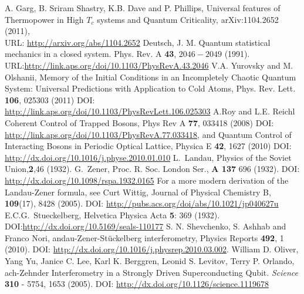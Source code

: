 \documentclass[a4paper,10pt]{article}
\begin{document}
\begin{thebibliography}{10}
\newblock A. Garg, B. Sriram Shastry, K.B. Dave and P. Phillips,
\newblock Universal features of Thermopower in High $T_c$ systems and Quantum Criticality,
\newblock arXiv:1104.2652 (2011),\\
\newblock URL: \url{http://arxiv.org/abs/1104.2652}
\newblock Deutsch, J. M. 
\newblock Quantum statistical mechanics in a closed system. 
\newblock Phys. Rev. A {\bf 43}, $2046-2049$ (1991).
\newblock URL:\url{http://link.aps.org/doi/10.1103/PhysRevA.43.2046}
\newblock V.A. Yurovsky and M. Olshanii,
\newblock Memory of the Initial Conditions in an Incompletely Chaotic Quantum System: Universal Predictions with Application to Cold Atoms,
\newblock  Phys. Rev. Lett. {\bf 106}, 025303 (2011) 
\newblock DOI: \url{http://link.aps.org/doi/10.1103/PhysRevLett.106.025303}
\newblock A.Roy and L.E. Reichl
\newblock Coherent Control of Trapped Bosons, 
\newblock Phys Rev A {\bf 77}, 033418 (2008)
\newblock DOI: \url{http://link.aps.org/doi/10.1103/PhysRevA.77.033418}, and
\newblock Quantum Control of Interacting Bosons in Periodic Optical Lattice, 
\newblock Physica E {\bf 42}, 1627 (2010)
\newblock DOI: \url{http://dx.doi.org/10.1016/j.physe.2010.01.010} 
\newblock L.~Landau, Physics of the Soviet Union,{\bf 2},46 (1932).
\newblock G.~Zener, Proc. R. Soc. London Ser., {\bf A 137} 696 (1932).
\newblock DOI: \url{http://dx.doi.org/10.1098/rspa.1932.0165} 
\newblock For a more modern derivation of the Landau-Zener formula, see
\newblock Curt Wittig, Journal of Physical Chemistry B, {\bf 109}(17), 8428 (2005).
\newblock DOI: \url{http://pubs.acs.org/doi/abs/10.1021/jp040627u}
\newblock E.C.G.~Stueckelberg,
\newblock Helvetica Physica Acta {\bf 5}: 369 (1932).
\newblock DOI:\url{http://dx.doi.org/10.5169/seals-110177}
\newblock S. N. Shevchenko, S. Ashhab and Franco Nori,
andau-{Z}ener-{S}t\"uckelberg interferometry,
\newblock Physics Reports {\bf 492}, 1 (2010).
\newblock DOI: \url{http://dx.doi.org/10.1016/j.physrep.2010.03.002}.
\newblock William D. Oliver, Yang Yu, Janice C. Lee, Karl K. Berggren, Leonid S. Levitov, Terry P. Orlando,
ach-{Z}ehnder {I}nterferometry in a {S}trongly {D}riven {S}uperconducting {Q}ubit.
\newblock \textit{Science} {\bf 310} - 5754, 1653 (2005).
\newblock DOI: \url{http://dx.doi.org/10.1126/science.1119678}

\end{thebibliography}
\end{document}
